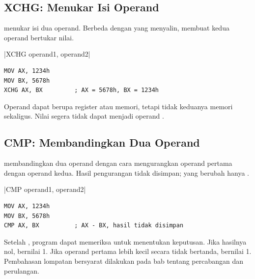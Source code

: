 \subsection{XCHG: Menukar Isi Operand}

 menukar isi dua operand. Berbeda dengan  yang
menyalin,  membuat kedua operand bertukar nilai.

\begin{center}
\lstasm|XCHG operand1, operand2|
\end{center}

\begin{lstlisting}[language=MASM, numbers=none]
MOV AX, 1234h
MOV BX, 5678h
XCHG AX, BX         ; AX = 5678h, BX = 1234h
\end{lstlisting}

Operand  dapat berupa register atau memori, tetapi tidak
keduanya memori sekaligus. Nilai segera tidak dapat menjadi operand
.

\subsection{CMP: Membandingkan Dua Operand}

 membandingkan dua operand dengan cara mengurangkan operand
pertama dengan operand kedua. Hasil pengurangan tidak disimpan;
yang berubah hanya .

\begin{center}
\lstasm|CMP operand1, operand2|
\end{center}

\begin{lstlisting}[language=MASM, numbers=none]
MOV AX, 1234h
MOV BX, 5678h
CMP AX, BX          ; AX - BX, hasil tidak disimpan
\end{lstlisting}

Setelah , program dapat memeriksa  untuk
menentukan keputusan. Jika hasilnya nol,  bernilai 1. Jika
operand pertama lebih kecil secara tidak bertanda, 
bernilai 1. Pembahasan lompatan bersyarat dilakukan pada bab tentang
percabangan dan perulangan.

